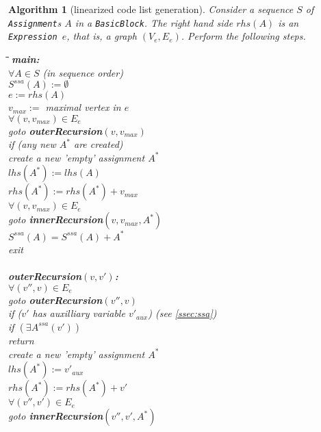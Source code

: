 \documentclass{book}
\newcommand{\Assignment}{{\tt Assignment}}
\newcommand{\BasicBlock}{{\tt BasicBlock}}
\newcommand{\Expression}{{\tt Expression}}
\newtheorem{Alg}{Algorithm}
\begin{document}
\begin{Alg}[linearized code list generation]
Consider a sequence $S$ of {\Assignment}s $A$ in a \BasicBlock. 
The right hand side $rhs(A)$ is an \Expression\ $e$, that is, a graph
$(V_e,E_e)$.
Perform the following steps.
\begin{tabbing}
\hspace*{3ex}\=\hspace*{3ex}\=\hspace*{3ex}\=\hspace*{3ex}\=\hspace*{-13ex}
{\bf main:}\\
\>$\forall  A \in S $ (in sequence order) \\
\>\> $S^{ssa}(A):=\emptyset$ \\
\>\> $e:=rhs(A)$ \\
\>\> $v_{max}:=$ maximal vertex in $e$ \\ 
\>\> $\forall (v,v_{max})\in E_e$ \\
\>\> goto {\bf outerRecursion}$(v,v_{max})$ \\ 
\>\> if (any new $A^*$ are created) \\ 
\>\>\> create a new 'empty' assignment $A^*$\\
\>\>\> $lhs(A^*):=lhs(A)$\\
\>\>\> $rhs(A^*):=rhs(A^*)+v_{max}$\\
\>\>\> $\forall (v,v_{max})\in E_e$ \\
\>\>\>\> goto {\bf innerRecursion}$(v,v_{max},A^*)$ \\ 
\>\>\> $S^{ssa}(A)=S^{ssa}(A)+A^*$ \\
\>exit\\
\\
{\bf outerRecursion$(v,v')$:}\\
\> $\forall (v'',v)\in E_e$ \\
\>\> goto {\bf outerRecursion}$(v'',v)$ \\ 
\> if ($v'$ has auxilliary variable $v'_{aux}$) (see \ref{ssec:ssa}) \\
\>\> if $(\exists A^{ssa}(v'))$\\
\>\>\> return\\
\>\> create a new 'empty' assignment $A^*$\\
\>\> $lhs(A^*):=v'_{aux}$\\
\>\> $rhs(A^*):=rhs(A^*)+v'$\\
\>\> $\forall (v'',v')\in E_e$ \\
\>\>\> goto {\bf innerRecursion}$(v'',v',A^*)$ \\ 

\end{tabbing}
\end{Alg}
\end{document}
